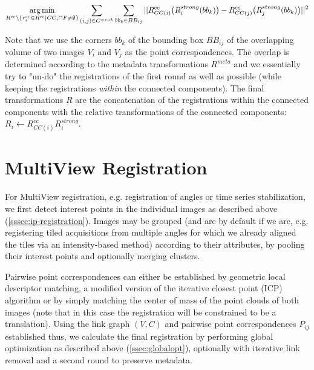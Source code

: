 \begin{equation}
\label{eq:globalopt-eq4}
\operatorname*{arg\,min}_{R^{cc} \setminus \{ r^{cc}_{i} \in R^{cc} | CC_i \cap F \neq \emptyset \}} \sum_{(i,j) \in C^{weak}} \sum_{bb_{k} \in BB_{ij}} || R^{cc}_{CC(i)}\big( R^{strong}_{i}( bb_{k})\big) -  R^{cc}_{CC(j)}\big( R^{strong}_{j}( bb_{k}) \big) ||^2 
\end{equation}

Note that we use the corners $bb_k$ of the bounding box $BB_{ij}$ of the overlapping volume of two images $V_i$ and $V_j$ as the point correspondences. The overlap is determined according to the metadata transformations $R^{meta}$ and we essentially try to "un-do" the registrations of the first round as well as possible (while keeping the registrations \emph{within} the connected components). The final transformations $R$ are the concatenation of the registrations within the connected components with the relative transformations of the connected components: $R_{i} \leftarrow R^{cc}_{CC(i)} R^{strong}_{i}$.

\section{MultiView Registration}

For MultiView registration, e.g. registration of angles or time series stabilization, we first detect interest points in the individual images as described above (\ref{sssec:ip-registration}). Images may be grouped (and are by default if we are, e.g. registering tiled acquisitions from multiple angles for which we already aligned the tiles via an intensity-based method) according to their attributes, by pooling their interest points and optionally merging clusters.

Pairwise point correspondences can either be established by geometric local descriptor matching, a modified version of the iterative closest point (ICP\cite{icp}) algorithm or by simply matching the center of mass of the point clouds of both images (note that in this case the registration will be constrained to be a translation). Using the link graph $(V,C)$ and pairwise point correspondences $P_{ij}$ established thus, we calculate the final registration by performing global optimization as described above (\ref{ssec:globalopt}), optionally with iterative link removal and a second round to preserve metadata.

